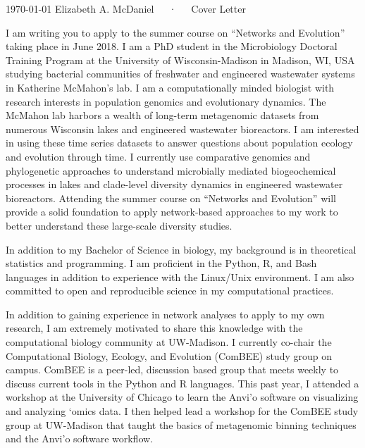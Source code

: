 \documentclass[14pt, letterpaper]{awesome-cv}
\begin{document}
\makecvheader[R]

\makecvfooter
  {\today}
  {Elizabeth A. McDaniel~~~·~~~Cover Letter}
  {}

\makelettertitle

\begin{cvletter}

I am writing you to apply to the summer course on “Networks and Evolution” taking place in June 2018. I am a PhD student in the Microbiology Doctoral Training Program at the University of Wisconsin-Madison in Madison, WI, USA studying bacterial communities of freshwater and engineered wastewater systems in Katherine McMahon’s lab. I am a computationally minded biologist with research interests in population genomics and evolutionary dynamics. The McMahon lab harbors a wealth of long-term metagenomic datasets from numerous Wisconsin lakes and engineered wastewater bioreactors. I am interested in using these time series datasets to answer questions about population ecology and evolution through time. I currently use comparative genomics and phylogenetic approaches to understand microbially mediated biogeochemical processes in lakes and clade-level diversity dynamics in engineered wastewater bioreactors. Attending the summer course on “Networks and Evolution” will provide a solid foundation to apply network-based approaches to my work to better understand these large-scale diversity studies. 

	In addition to my Bachelor of Science in biology, my background is in theoretical statistics and programming. I am proficient in the Python, R, and Bash languages in addition to experience with the Linux/Unix environment. I am also committed to open and reproducible science in my computational practices. 

	In addition to gaining experience in network analyses to apply to my own research, I am extremely motivated to share this knowledge with the computational biology community at UW-Madison. I currently co-chair the Computational Biology, Ecology, and Evolution (ComBEE) study group on campus. ComBEE is a peer-led, discussion based group that meets weekly to discuss current tools in the Python and R languages. This past year, I attended a workshop at the University of Chicago to learn the Anvi’o software on visualizing and analyzing ‘omics data. I then helped lead a workshop for the ComBEE study group at UW-Madison that taught the basics of metagenomic binning techniques and the Anvi’o software workflow.  


\end{cvletter}
\end{document}
